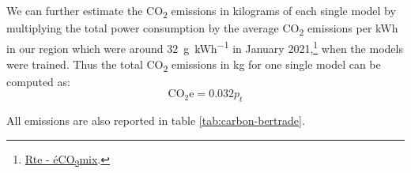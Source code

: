 We can further estimate the CO\textsubscript{2} emissions in kilograms of each single model by multiplying the total power consumption by the average CO\textsubscript{2} emissions per \unit{\kWh} in our region which were around \qty{32}{\gram\per\kWh} in January 2021,\footnote{\href{https://www.rte-france.com/eco2mix/les-emissions-de-co2-par-kwh-produit-en-france}{Rte - éCO\textsubscript{2}mix}.} when the models were trained. Thus the total CO\textsubscript{2} emissions in kg for one single model can be computed as:
\begin{equation*}
    \text{CO}_{2}\text{e} = 0.032 p_t
\end{equation*}

All emissions are also reported in table \ref{tab:carbon-bertrade}.
